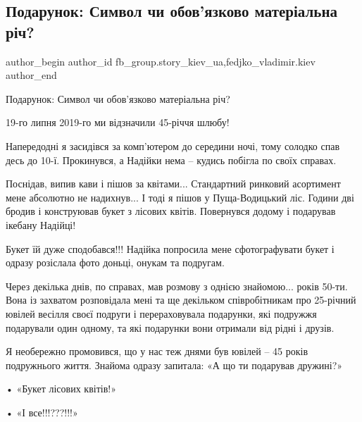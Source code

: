  
 
 
 
 
 
\subsection{Подарунок: Символ чи обов’язково матеріальна річ?}
\label{sec:07_12_2021.fb.fb_group.story_kiev_ua.1.podarok}
 
\ifcmt
 author_begin
   author_id fb_group.story_kiev_ua,fedjko_vladimir.kiev
 author_end
\fi

Подарунок: Символ чи обов’язково матеріальна річ? 

19-го липня 2019-го ми відзначили 45-річчя шлюбу! 

Напередодні я засидівся за комп’ютером до середини ночі, тому солодко спав десь
до 10-ї. Прокинувся, а Надійки нема – кудись побігла по своїх справах. 

Поснідав, випив кави і пішов за квітами... Стандартний ринковий асортимент мене
абсолютно не надихнув... І тоді я пішов у Пуща-Водицький ліс. Години дві бродив і
конструював букет з лісових квітів. Повернувся додому і подарував ікебану
Надійці!

Букет їй дуже сподобався!!! Надійка попросила мене сфотографувати букет і
одразу розіслала фото доньці, онукам та подругам. 

Через декілька днів, по справах, мав розмову з однією знайомою... років 50-ти.
Вона із захватом розповідала мені та ще декільком співробітникам про 25-річний
ювілей весілля своєї подруги і перераховувала подарунки, які подружжя
подарували один одному, та які подарунки вони отримали від рідні і друзів. 

Я необережно промовився, що у нас теж днями був ювілей – 45 років подружнього
життя. Знайома одразу запитала: «А що ти подарував дружині?»

• «Букет лісових квітів!»

• «І все!!!???!!!»

